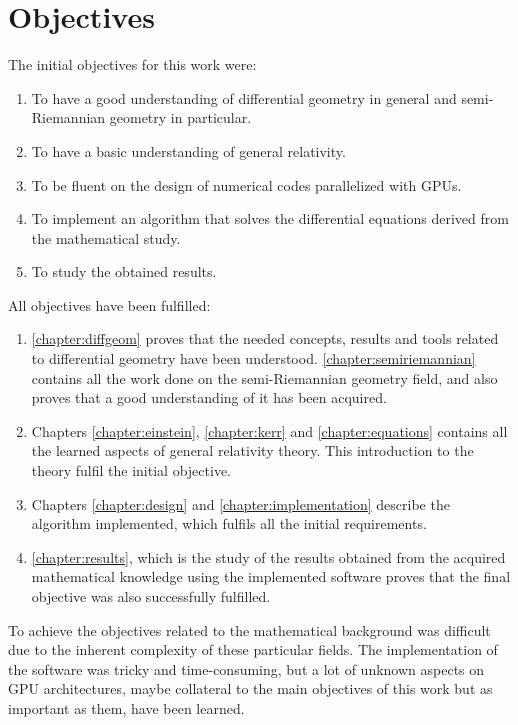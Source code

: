 \chapter{Objectives}

The initial objectives for this work were:
\begin{enumerate}
	\item To have a good understanding of differential geometry in general and semi-Riemannian geometry in particular.
	\item To have a basic understanding of general relativity.
	\item To be fluent on the design of numerical codes parallelized with \acp{GPU}.
	\item To implement an algorithm that solves the differential equations derived from the mathematical study.
	\item To study the obtained results.
\end{enumerate}

All objectives have been fulfilled:
\begin{enumerate}
	\item \autoref{chapter:diffgeom} proves that the needed concepts, results and tools related to differential geometry have been understood. \autoref{chapter:semiriemannian} contains all the work done on the semi-Riemannian geometry field, and also proves that a good understanding of it has been acquired.
	\item Chapters \ref{chapter:einstein}, \ref{chapter:kerr} and \ref{chapter:equations} contains all the learned aspects of general relativity theory. This introduction to the theory fulfil the initial objective.
	\item Chapters \ref{chapter:design} and \ref{chapter:implementation} describe the algorithm implemented, which fulfils all the initial requirements.
	\item \autoref{chapter:results}, which is the study of the results obtained from the acquired mathematical knowledge using the implemented software proves that the final objective was also successfully fulfilled. 
\end{enumerate}

To achieve the objectives related to the mathematical background was difficult due to the inherent complexity of these particular fields. The implementation of the software was tricky and time-consuming, but a lot of unknown aspects on \ac{GPU} architectures, maybe collateral to the main objectives of this work but as important as them, have been learned.